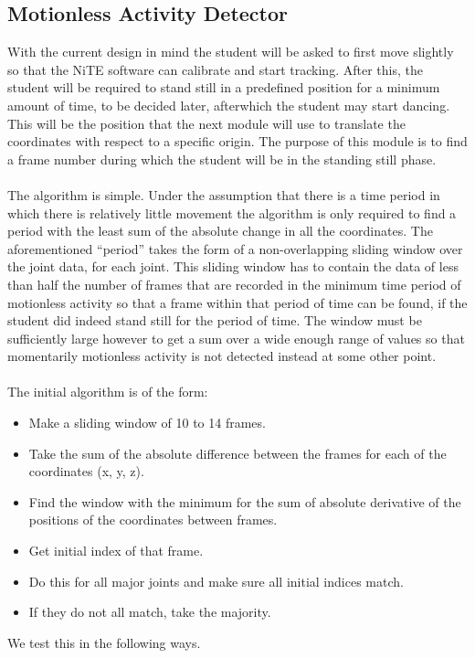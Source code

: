 \documentclass[10pt]{article}
\begin{document}
\subsection{Motionless Activity Detector}
\noindent 
With the current design in mind the student will be asked to first move slightly so that the NiTE software can calibrate and start tracking. After this, the student will be required to stand still in a predefined position for a minimum amount of time, to be decided later, afterwhich the student may start dancing. This will be the position that the next module will use to translate the coordinates with respect to a specific origin. The purpose of this module is to find a frame number during which the student will be in the standing still phase.\\\\
\noindent 
The algorithm is simple. Under the assumption that there is a time period in which there is relatively little movement the algorithm is only required to find a period with the least sum of the absolute change in all the coordinates. The aforementioned ``period'' takes the form of a non-overlapping sliding window over the joint data, for each joint. This sliding window has to contain the data of less than half the number of frames that are recorded in the minimum time period of motionless activity so that a frame within that period of time can be found, if the student did indeed stand still for the period of time. The window must be sufficiently large however to get a sum over a wide enough range of values so that momentarily motionless activity is not detected instead at some other point.\\\\
\noindent
The initial algorithm is of the form:
\begin{itemize}
\setlength{\itemsep}{1pt}
\setlength{\parskip}{0pt}
\setlength{\parsep}{0pt}
	\item Make a sliding window of 10 to 14 frames.
	\item Take the sum of the absolute difference between the frames for each of the coordinates (x, y, z).
	\item Find the window with the minimum for the sum of absolute derivative of the positions of the coordinates between frames.
	\item Get initial index of that frame.
\item Do this for all major joints and make sure all initial indices match.
\item If they do not all match, take the majority. 
\end{itemize}
\noindent
We test this in the following ways.
\end{document}
